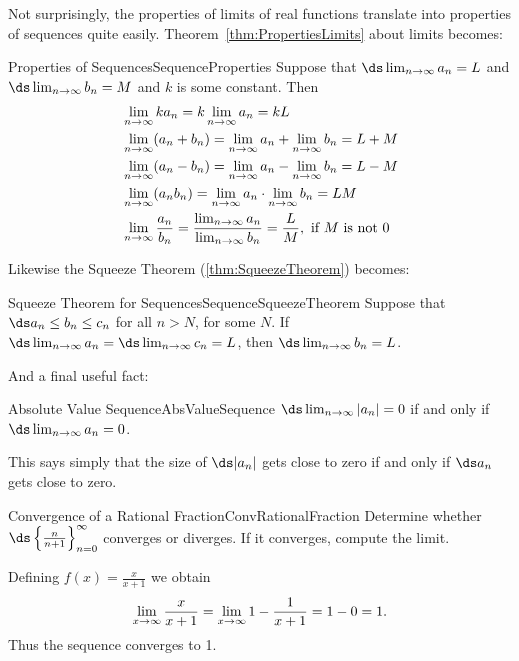 Not surprisingly, the properties of limits of real functions translate
into properties of sequences quite easily. 
Theorem~\ref{thm:PropertiesLimits} about limits becomes:

\begin{theorem}{Properties of Sequences}{SequenceProperties}
Suppose that $\ds\lim_{n\to\infty}a_n=L$ and 
$\ds\lim_{n\to\infty}b_n=M$ and
$k$ is some constant. Then
\begin{align*}
&\lim_{n\to\infty} ka_n = k\lim_{n\to\infty}a_n=kL	\\
&\lim_{n\to\infty} (a_n+b_n) = \lim_{n\to\infty}a_n+\lim_{n\to\infty}b_n=L+M	\\
&\lim_{n\to\infty} (a_n-b_n) = \lim_{n\to\infty}a_n-\lim_{n\to\infty}b_n=L-M	\\
&\lim_{n\to\infty} (a_nb_n) = \lim_{n\to\infty}a_n\cdot\lim_{n\to\infty}b_n=LM	\\
&\lim_{n\to\infty} {a_n\over b_n} = {\lim_{n\to\infty}a_n\over
  \lim_{n\to\infty}b_n}={L\over M},\hbox{ if $M$ is not 0}	\\
\end{align*}
\end{theorem}

Likewise the Squeeze Theorem (\ref{thm:SqueezeTheorem}) becomes:

\begin{theorem}{Squeeze Theorem for Sequences}{SequenceSqueezeTheorem}
Suppose that $\ds a_n \leq b_n \leq c_n$ for all $n>N$, for some $N$.
If $\ds\lim_{n\to\infty}a_n=\ds\lim_{n\to\infty}c_n=L$, 
then $\ds\lim_{n\to\infty}b_n=L$.
\end{theorem}

And a final useful fact:

\begin{theorem}{Absolute Value Sequence}{AbsValueSequence}
$\ds\lim_{n\to\infty}|a_n|=0$ if and only if
$\ds\lim_{n\to\infty}a_n=0$.
\end{theorem}

This says simply that the size of $\ds |a_n|$ gets close to zero if and
only if $\ds a_n$ gets close to zero.

\begin{example}{Convergence of a Rational Fraction}{ConvRationalFraction}
Determine whether $\ds\left\{{n\over n+1}\right\}_{n=0}^\infty$ converges or
diverges. If it converges, compute the limit.
\end{example}
\begin{solution}
Defining $f(x)=\frac{x}{x+1}$ we obtain
$$
\lim_{x\to\infty}{x\over x+1}=\lim_{x\to\infty}1-{1\over x+1}=1-0=1.
$$
Thus the sequence converges to 1.
\end{solution}

